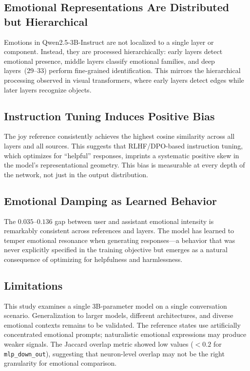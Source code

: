\documentclass[11pt,a4paper]{article}
\begin{document}
\subsection{Emotional Representations Are Distributed but Hierarchical}

Emotions in Qwen2.5-3B-Instruct are not localized to a single layer or component. Instead, they are processed hierarchically: early layers detect emotional presence, middle layers classify emotional families, and deep layers~(29--33) perform fine-grained identification. This mirrors the hierarchical processing observed in visual transformers, where early layers detect edges while later layers recognize objects.

\subsection{Instruction Tuning Induces Positive Bias}

The joy reference consistently achieves the highest cosine similarity across all layers and all sources. This suggests that RLHF/DPO-based instruction tuning, which optimizes for ``helpful'' responses, imprints a systematic positive skew in the model's representational geometry. This bias is measurable at every depth of the network, not just in the output distribution.

\subsection{Emotional Damping as Learned Behavior}

The $0.035$--$0.136$ gap between user and assistant emotional intensity is remarkably consistent across references and layers. The model has learned to temper emotional resonance when generating responses---a behavior that was never explicitly specified in the training objective but emerges as a natural consequence of optimizing for helpfulness and harmlessness.

\subsection{Limitations}

This study examines a single 3B-parameter model on a single conversation scenario. Generalization to larger models, different architectures, and diverse emotional contexts remains to be validated. The reference states use artificially concentrated emotional prompts; naturalistic emotional expressions may produce weaker signals. The Jaccard overlap metric showed low values ($< 0.2$ for \texttt{mlp\_down\_out}), suggesting that neuron-level overlap may not be the right granularity for emotional comparison.
\end{document}
